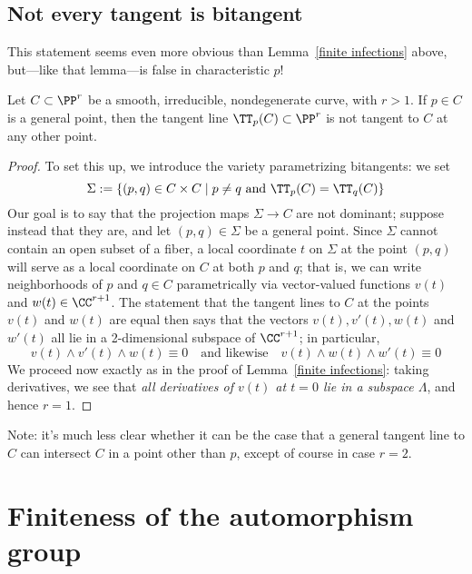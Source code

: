  \subsection{Not every tangent is bitangent}
 
 This statement seems even more obvious than Lemma~\ref{finite infections} above, but---like that lemma---is false in characteristic $p$!
 
 \begin{lemma}\label{tangent not bitangent}
 Let $C \subset \PP^r$ be a smooth, irreducible, nondegenerate curve, with $r > 1$. If $p \in C$ is a general point, then the tangent line $\TT_p(C) \subset \PP^r$ is not tangent to $C$ at any other point.
 \end{lemma}
 
 \begin{proof}
 To set this up, we introduce the variety parametrizing bitangents: we set
 $$
 \Sigma := \{ (p,q) \in C \times C \mid p \neq q \text{ and }\TT_p(C) = \TT_q(C) \}
 $$
 Our goal is to say that the projection maps $\Sigma \to C$ are not dominant; suppose instead that they are, and let $(p,q) \in \Sigma$ be a general point. Since $\Sigma$ cannot contain an open subset of a fiber, a local coordinate $t$ on $\Sigma$ at the point $(p,q)$ will serve as a local coordinate on $C$ at both $p$ and $q$; that is, we can write neighborhoods of $p$ and $q \in C$ parametrically via vector-valued functions $v(t)$ and $w(t) \in \CC^{r+1}$. The statement that the tangent lines to $C$ at the points $v(t)$ and $w(t)$ are equal then says that the vectors $v(t), v'(t), w(t)$ and $w'(t)$ all lie in a 2-dimensional subspace of $\CC^{r+1}$; in particular,
 $$
 v(t) \wedge v'(t) \wedge w(t) \equiv 0 \quad \text{and likewise} \quad v(t) \wedge w(t) \wedge w'(t) \equiv 0
 $$
We proceed now exactly as in the proof of Lemma~\ref{finite infections}: taking derivatives, we see that \emph{all derivatives of $v(t)$ at $t=0$ lie in a subspace $\Lambda$}, and hence $r=1$.
 \end{proof}

Note: it's much less clear whether it can be the case that a general tangent line to $C$ can intersect $C$ in a point other than $p$, except of course in case $r=2$. %

\section{Finiteness of the automorphism group}\label{finiteness section}


